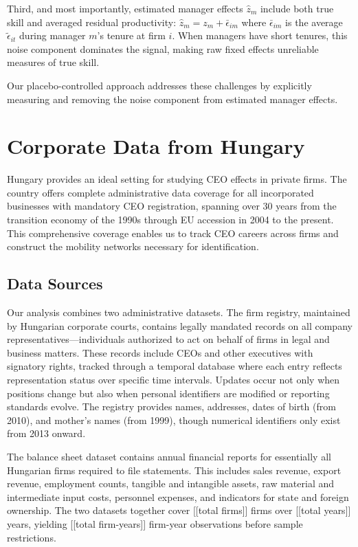 \documentclass[11pt,a4paper]{article}
\begin{document}
Third, and most importantly, estimated manager effects $\hat{z}_m$ include both true skill and averaged residual productivity: $\hat{z}_m = z_m + \bar{\epsilon}_{im}$ where $\bar{\epsilon}_{im}$ is the average $\tilde{\epsilon}_{it}$ during manager $m$'s tenure at firm $i$. When managers have short tenures, this noise component dominates the signal, making raw fixed effects unreliable measures of true skill.

Our placebo-controlled approach addresses these challenges by explicitly measuring and removing the noise component from estimated manager effects.

\section{Corporate Data from Hungary}

Hungary provides an ideal setting for studying CEO effects in private firms. The country offers complete administrative data coverage for all incorporated businesses with mandatory CEO registration, spanning over 30 years from the transition economy of the 1990s through EU accession in 2004 to the present. This comprehensive coverage enables us to track CEO careers across firms and construct the mobility networks necessary for identification.

\subsection{Data Sources}

Our analysis combines two administrative datasets. The firm registry, maintained by Hungarian corporate courts, contains legally mandated records on all company representatives—individuals authorized to act on behalf of firms in legal and business matters. These records include CEOs and other executives with signatory rights, tracked through a temporal database where each entry reflects representation status over specific time intervals. Updates occur not only when positions change but also when personal identifiers are modified or reporting standards evolve. The registry provides names, addresses, dates of birth (from 2010), and mother's names (from 1999), though numerical identifiers only exist from 2013 onward.

The balance sheet dataset contains annual financial reports for essentially all Hungarian firms required to file statements. This includes sales revenue, export revenue, employment counts, tangible and intangible assets, raw material and intermediate input costs, personnel expenses, and indicators for state and foreign ownership. The two datasets together cover [[total firms]] firms over [[total years]] years, yielding [[total firm-years]] firm-year observations before sample restrictions.
\end{document}
